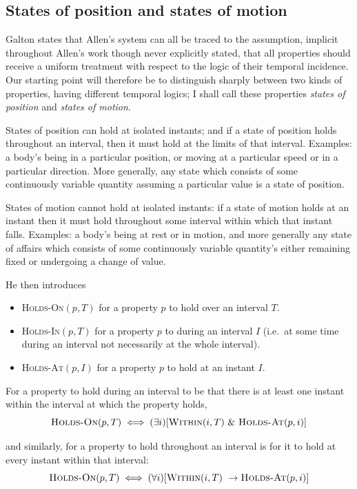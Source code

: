 \subsection{States of position and states of motion}
Galton states that Allen's system can all be traced to the assumption, implicit throughout Allen's
work though never explicitly stated, that all properties should receive a
uniform treatment with respect to the logic of their temporal incidence. Our
starting point will therefore be to distinguish sharply between two kinds of
properties, having different temporal logics; I shall call these properties \textit{states
	of position} and \textit{states of motion}.

States of position can hold at isolated instants; and if a state of position
holds throughout an interval, then it must hold at the limits of that interval.
Examples: a body's being in a particular position, or moving at a particular
speed or in a particular direction. More generally, any state which consists of
some continuously variable quantity assuming a particular value is a state of
position.

States of motion cannot hold at isolated instants: if a state of motion holds
at an instant then it must hold throughout some interval within which that
instant falls. Examples: a body's being at rest or in motion, and more generally
any state of affairs which consists of some continuously variable quantity's
either remaining fixed or undergoing a change of value.

He then introduces
\begin{itemize}
	\item  \textsc{Holds-On}$(p, T)$ for a property $p$ to hold over an interval $T$.
	\item \textsc{Holds-In}$(p, T)$ for a property $p$ to during an interval $I$ (i.e.\ at some time during an interval not necessarily at the whole interval).
	\item \textsc{Holds-At}$(p, I)$ for a property $p$ to hold at an instant $I$.
\end{itemize}

For a property to hold during
an interval to be that there is at least one instant within the interval at which
the property holds,
\[
	\textsc{Holds-On}(p, T) \iff (\exists i)[\textsc{Within}(i, T) \  \& \ \textsc{Holds-At}(p, i)]
\]

and similarly, for a property to hold throughout an interval is for it to hold at
every instant within that interval:
\[
	\textsc{Holds-On}(p, T) \iff (\forall i)[\textsc{Within}(i, T) \  \to \textsc{Holds-At}(p, i)]
\]


